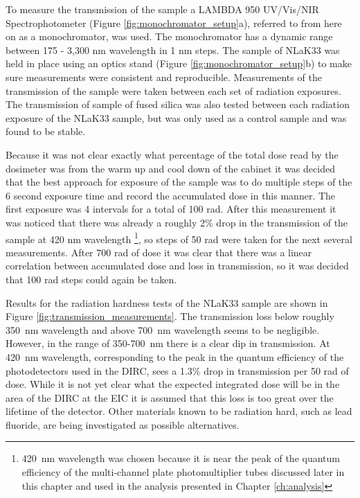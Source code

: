 To measure the transmission of the sample a LAMBDA 950 UV/Vis/NIR Spectrophotometer \cite{Monochromator} (Figure \ref{fig:monochromator_setup}a), referred to from here on as a monochromator, was used. The monochromator has a dynamic range between 175 - 3,300 nm wavelength in 1 nm steps. The sample of NLaK33 was held in place using an optics stand (Figure \ref{fig:monochromator_setup}b) to make sure measurements were consistent and reproducible. Measurements of the transmission of the sample were taken between each set of radiation exposures. The transmission of sample of fused silica was also tested between each radiation exposure of the NLaK33 sample, but was only used as a control sample and was found to be stable.

Because it was not clear exactly what percentage of the total dose read by the dosimeter was from the warm up and cool down of the cabinet it was decided that the best approach for exposure of the sample was to do multiple steps of the 6 second exposure time and record the accumulated dose in this manner. The first exposure was 4 intervals for a total of 100 rad. After this measurement it was noticed that there was already a roughly 2\% drop in the transmission of the sample at 420 nm wavelength \footnote{420~nm wavelength was chosen because it is near the peak of the quantum efficiency of the multi-channel plate photomultiplier tubes discussed later in this chapter and used in the analysis presented in Chapter \ref{ch:analysis}}, so steps of 50 rad were taken for the next several measurements. After 700 rad of dose it was clear that there was a linear correlation between accumulated dose and loss in transmission, so it was decided that 100 rad steps could again be taken. 

Results for the radiation hardness tests of the NLaK33 sample are shown in Figure \ref{fig:transmission_measurements}. The transmission loss below roughly 350~nm wavelength and above 700~nm wavelength seems to be negligible. However, in the range of 350-700~nm there is a clear dip in transmission. At 420~nm wavelength, corresponding to the peak in the quantum efficiency of the photodetectors used in the DIRC, sees a 1.3\% drop in transmission per 50 rad of dose. While it is not yet clear what the expected integrated dose will be in the area of the DIRC at the EIC it is assumed that this loss is too great over the lifetime of the detector. Other materials known to be radiation hard, such as lead fluoride, are being investigated as possible alternatives.

